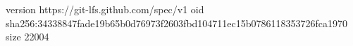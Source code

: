 version https://git-lfs.github.com/spec/v1
oid sha256:34338847fade19b65b0d76973f2603fbd104711ec15b0786118353726fca1970
size 22004
